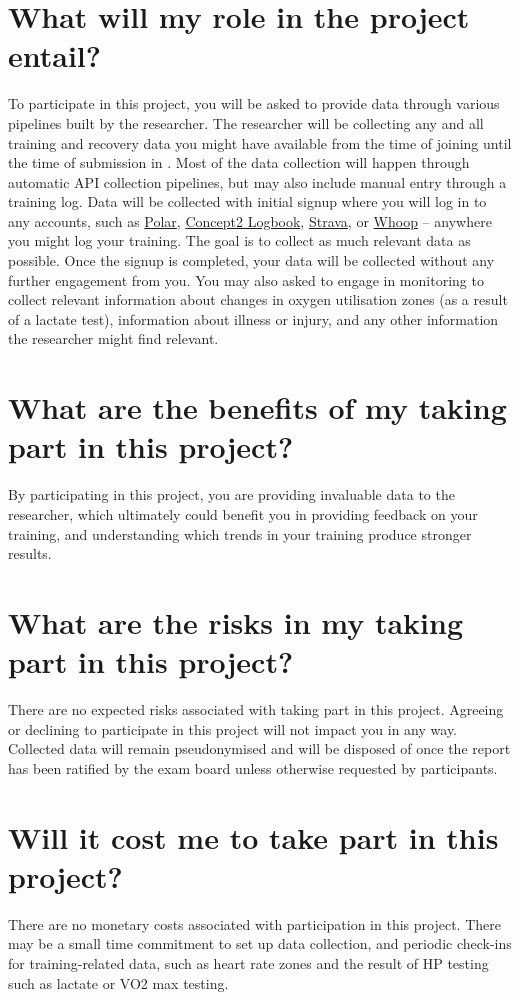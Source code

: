 \section*{What will my role in the project entail?}
To participate in this project, you will be asked to provide data through various pipelines built by the researcher. The researcher will be collecting any and all training and recovery data you might have available from the time of joining until the time of submission in \deadline. Most of the data collection will happen through automatic API collection pipelines, but may also include manual entry through a training log. Data will be collected with initial signup where you will log in to any accounts, such as \href{https://flow.polar.com/}{Polar}, \href{https://log.concept2.com/}{Concept2 Logbook}, \href{https://www.strava.com/}{Strava}, or \href{https://app.whoop.com/}{Whoop} -- anywhere you might log your training. The goal is to collect as much relevant data as possible. Once the signup is completed, your data will be collected without any further engagement from you. You may also asked to engage in monitoring to collect relevant information about changes in oxygen utilisation zones (as a result of a lactate test), information about illness or injury, and any other information the researcher might find relevant.

\section*{What are the benefits of my taking part in this project?}
By participating in this project, you are providing invaluable data to the researcher, which ultimately could benefit you in providing feedback on your training, and understanding which trends in your training produce stronger results.
\section*{What are the risks in my taking part in this project?}
There are no expected risks associated with taking part in this project. Agreeing or declining to participate in this project will not impact you in any way. Collected data will remain pseudonymised and will be disposed of once the report has been ratified by the exam board unless otherwise requested by participants.
\section*{Will it cost me to take part in this project?}
There are no monetary costs associated with participation in this project. There may be a small time commitment to set up data collection, and periodic check-ins for training-related data, such as heart rate zones and the result of HP testing such as lactate or VO2 max testing.
